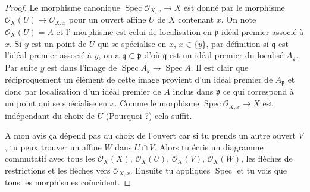 \documentclass[A4, 11pt]{article}
\def\Spec{ \operatorname{Spec}}
\begin{document}
\begin{proof}
Le morphisme canonique $\Spec \mathcal{O}_{X,x} \rightarrow X$ est donné par le morphisme 
$\mathcal{O}_{X}(U) \rightarrow \mathcal{O}_{X,x}$ pour un ouvert affine $U$ de $X$ contenant $x$. On note $\mathcal{O}_{X}(U)=A$ et l' morphisme est celui de localisation en $\mathfrak{p}$ idéal premier associé à $x$. Si $y$ est un point de $U$ qui se spécialise en $x$, $x\in \overline{\{y\}}$, par définition si $\mathfrak{q}$ est l'idéal premier associé à $y$, on a $\mathfrak{q} \subset \mathfrak{p}$ d'où $\mathfrak{q}$ est un idéal premier du localisé $A_{\mathfrak{p}}$. Par suite $y$ est dans l'image de $\Spec A_{\mathfrak{p}} \rightarrow \Spec A$. Il est clair que réciproquement un élément de cette image provient d'un idéal premier de $A_{\mathfrak{p}}$ et donc par localisation d'un idéal premier de $A$ inclus dans $\mathfrak{p}$ ce qui correspond à un point qui se spécialise en $x$. Comme le morphisme $\Spec \mathcal{O}_{X,x} \rightarrow X$ est indépendant du choix de $U$ (Pourquoi ?) cela suffit.

{\color{blue} A mon avis ça dépend pas du choix de l'ouvert car si tu prends un autre ouvert $V$, tu peux trouver un affine $W$ dans $U\cap V$. Alors tu écris un diagramme commutatif avec tous les $\mathcal{O}_X(X)$, $\mathcal{O}_X(U)$, $\mathcal{O}_X(V)$, $\mathcal{O}_X(W)$, les flèches de restrictions et les flèches vers $\mathcal{O}_{X,x}$. Ensuite tu appliques $\Spec$ et tu vois que tous les morphismes coïncident.}

\end{proof}
\end{document}
